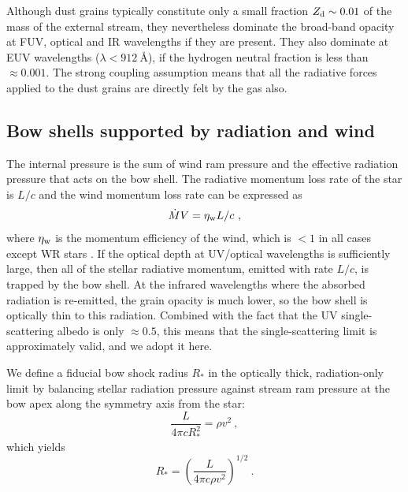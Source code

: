 Although dust grains typically constitute only a small fraction
\(Z_{\text{d}} \sim 0.01\) of the mass of the external stream, they
nevertheless dominate the broad-band opacity at FUV, optical and IR
wavelengths if they are present. They also dominate at EUV wavelengths
(\(\lambda < \SI{912}{\angstrom}\)), if the hydrogen neutral fraction is
less than \(\approx 0.001\).  The strong coupling assumption means that all
the radiative forces applied to the dust grains are directly felt by
the gas also.

\subsection{Bow shells supported by radiation and wind}
\label{sec:three-bow-regimes}

The internal pressure is the sum of wind ram pressure and the
effective radiation pressure that acts on the bow shell.  The
radiative momentum loss rate of the star is \(L/c\) and the wind
momentum loss rate can be expressed as
\begin{equation}
  \label{eq:wind-efficiency}
  \dot{M} V = \eta_{\text{w}} L / c \ , 
\end{equation}
where \(\eta_{\text{w}}\) is the momentum efficiency of the wind, which is
\(< 1\) in all cases except WR stars \citep{Lamers:1999b}. If the
optical depth at UV/optical wavelengths is sufficiently large, then
all of the stellar radiative momentum, emitted with rate \(L/c\), is
trapped by the bow shell.  At the infrared wavelengths where the
absorbed radiation is re-emitted, the grain opacity is much lower, so
the bow shell is optically thin to this radiation.  Combined with the fact
that the UV single-scattering albedo is only \(\approx 0.5\), this means
that the single-scattering limit is approximately valid, and we adopt
it here.

We define a fiducial bow shock radius \(R_*\) in the optically thick,
radiation-only limit by balancing stellar radiation pressure against
stream ram pressure at the bow apex along the
symmetry axis from the star:
\begin{equation}
  \label{eq:rad-press-balance-thick}
  \frac{L}{4 \pi c R_*^2} = \rho v^2 \ ,
\end{equation}
which yields 
\begin{equation}
  \label{eq:Rstar}
  R_* = \left(\frac{L}{4\pi c \rho v^2}\right)^{1/2} \ .
\end{equation}

